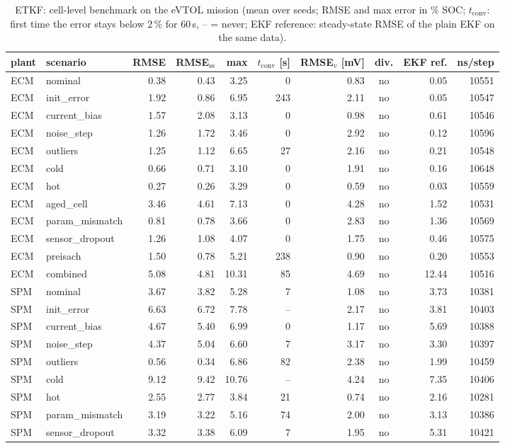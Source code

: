 \begin{table}[H]\centering\footnotesize\setlength{\tabcolsep}{4pt}
\caption{ETKF: cell-level benchmark on the eVTOL mission (mean over seeds; RMSE and max error in \% SOC; $t_\mathrm{conv}$: first time the error stays below 2\,\% for 60\,s, -- = never; EKF reference: steady-state RMSE of the plain EKF on the same data).}\label{tab:cell_ETKF}
\begin{tabular}{llrrrrrcrr}\toprule
plant & scenario & RMSE & RMSE$_\mathrm{ss}$ & max & $t_\mathrm{conv}$ [s] & RMSE$_v$ [mV] & div. & EKF ref. & ns/step \\ \midrule
ECM & nominal & 0.38 & 0.43 & 3.25 & 0 & 0.83 & no & 0.05 & 10551 \\
ECM & init\_error & 1.92 & 0.86 & 6.95 & 243 & 2.11 & no & 0.05 & 10547 \\
ECM & current\_bias & 1.57 & 2.08 & 3.13 & 0 & 0.98 & no & 0.61 & 10546 \\
ECM & noise\_step & 1.26 & 1.72 & 3.46 & 0 & 2.92 & no & 0.12 & 10596 \\
ECM & outliers & 1.25 & 1.12 & 6.65 & 27 & 2.16 & no & 0.21 & 10548 \\
ECM & cold & 0.66 & 0.71 & 3.10 & 0 & 1.91 & no & 0.16 & 10648 \\
ECM & hot & 0.27 & 0.26 & 3.29 & 0 & 0.59 & no & 0.03 & 10559 \\
ECM & aged\_cell & 3.46 & 4.61 & 7.13 & 0 & 4.28 & no & 1.52 & 10531 \\
ECM & param\_mismatch & 0.81 & 0.78 & 3.66 & 0 & 2.83 & no & 1.36 & 10569 \\
ECM & sensor\_dropout & 1.26 & 1.08 & 4.07 & 0 & 1.75 & no & 0.46 & 10575 \\
ECM & preisach & 1.50 & 0.78 & 5.21 & 238 & 0.90 & no & 0.20 & 10553 \\
ECM & combined & 5.08 & 4.81 & 10.31 & 85 & 4.69 & no & 12.44 & 10516 \\
\midrule
SPM & nominal & 3.67 & 3.82 & 5.28 & 7 & 1.08 & no & 3.73 & 10381 \\
SPM & init\_error & 6.63 & 6.72 & 7.78 & -- & 2.17 & no & 3.81 & 10403 \\
SPM & current\_bias & 4.67 & 5.40 & 6.99 & 0 & 1.17 & no & 5.69 & 10388 \\
SPM & noise\_step & 4.37 & 5.04 & 6.60 & 7 & 3.17 & no & 3.30 & 10397 \\
SPM & outliers & 0.56 & 0.34 & 6.86 & 82 & 2.38 & no & 1.99 & 10459 \\
SPM & cold & 9.12 & 9.42 & 10.76 & -- & 4.24 & no & 7.35 & 10406 \\
SPM & hot & 2.55 & 2.77 & 3.84 & 21 & 0.74 & no & 2.16 & 10281 \\
SPM & param\_mismatch & 3.19 & 3.22 & 5.16 & 74 & 2.00 & no & 3.13 & 10386 \\
SPM & sensor\_dropout & 3.32 & 3.38 & 6.09 & 7 & 1.95 & no & 5.31 & 10421 \\
\bottomrule\end{tabular}\end{table}
